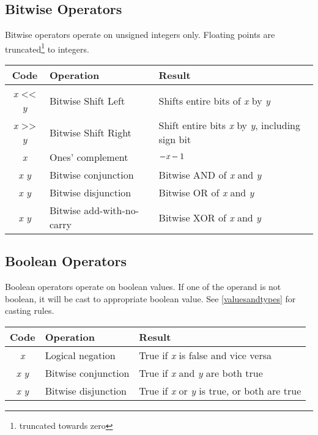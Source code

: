 \subsection{Bitwise Operators}

Bitwise operators operate on unsigned integers only. Floating points are truncated\footnote{truncated towards zero} to integers.

\begin{tabulary}{\textwidth}{clL}
Code & Operation & Result \\
\hline
\emph{x}  <\!< \emph{y} & Bitwise Shift Left & Shifts entire bits of \emph{x} by \emph{y} \\
\emph{x}  >\!> \emph{y} & Bitwise Shift Right & Shift entire bits \emph{x} by \emph{y}, including sign bit \\
 \emph{x} & Ones' complement & $-\emph{x}-1$ \\
\emph{x}   \emph{y} & Bitwise conjunction & Bitwise AND of \emph{x} and \emph{y} \\
\emph{x}   \emph{y} & Bitwise disjunction & Bitwise OR of \emph{x} and \emph{y} \\
\emph{x}   \emph{y} & Bitwise add-with-no-carry & Bitwise XOR of \emph{x} and \emph{y} \\
\end{tabulary}

\subsection{Boolean Operators}

Boolean operators operate on boolean values. If one of the operand is not boolean, it will be cast to appropriate boolean value. See \ref{valuesandtypes} for casting rules.

\begin{tabulary}{\textwidth}{clL}
Code & Operation & Result \\
\hline
{} \emph{x} & Logical negation & True if \emph{x} is false and vice versa \\
\emph{x}  \emph{y} & Bitwise conjunction & True if \emph{x} and \emph{y} are both true \\
\emph{x}  \emph{y} & Bitwise disjunction & True if \emph{x} or \emph{y} is true, or  both are true \\
\end{tabulary}

